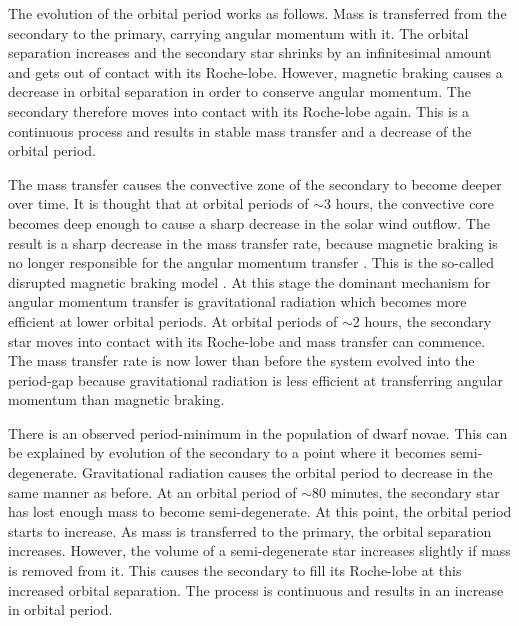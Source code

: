 The evolution of the orbital period works as follows. Mass is transferred from the secondary to the primary, carrying angular momentum with it.  The orbital separation increases and the secondary star shrinks by an infinitesimal amount and gets out of contact with its Roche-lobe. However, magnetic braking causes a decrease in orbital separation in order to conserve angular momentum. The  secondary therefore moves into contact with its Roche-lobe again. This is a continuous process and results in stable mass transfer and a decrease of the orbital period.

The mass transfer causes the convective zone of the secondary to become deeper over time. It is thought that at orbital periods of $\sim$3 hours, the convective core becomes deep enough to cause a sharp decrease in the solar wind outflow. The result is a sharp decrease in the mass transfer rate, because magnetic braking is no longer responsible for the angular momentum transfer \citep{warnerbible}. This is the so-called disrupted magnetic braking model \citep{baraffekolb}. At this stage the dominant mechanism for angular momentum transfer is gravitational radiation which becomes more efficient at lower orbital periods. At orbital periods of $\sim$2 hours, the secondary star moves into contact with its Roche-lobe and mass transfer can commence. The mass transfer rate is now lower than before the system evolved into the period-gap because gravitational radiation is less efficient at transferring angular momentum than magnetic braking.


% 
% 



There is an observed period-minimum in the population of dwarf novae. This can be explained by evolution of the secondary to a point where it becomes semi-degenerate. Gravitational radiation causes the orbital period to decrease in the same manner as before. At an orbital period of $\sim$80 minutes, the secondary star has lost enough mass to become semi-degenerate. At this point, the orbital period starts to increase. As mass is transferred to the primary, the orbital separation increases. However, the volume of a semi-degenerate star increases slightly if mass is removed from it. This causes the secondary to fill its Roche-lobe at this increased orbital separation. The process is continuous and results in an increase in orbital period.



